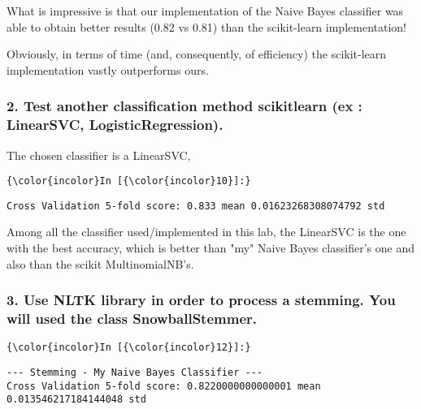 \documentclass[11pt]{article}
\begin{document}
What is impressive is that our implementation of the Naive Bayes
classifier was able to obtain better results (0.82 vs 0.81) than the
scikit-learn implementation!

Obviously, in terms of time (and, consequently, of efficiency) the
scikit-learn implementation vastly outperforms ours.

    \subsubsection{2. Test another classification method scikitlearn (ex :
LinearSVC,
LogisticRegression).}\label{test-another-classification-method-scikitlearn-ex-linearsvc-logisticregression.}

The chosen classifier is a LinearSVC,

    \begin{Verbatim}[commandchars=\\\{\}]
{\color{incolor}In [{\color{incolor}10}]:} 
\end{Verbatim}


    \begin{Verbatim}[commandchars=\\\{\}]
Cross Validation 5-fold score: 0.833 mean 0.01623268308074792 std 

    \end{Verbatim}

    Among all the classifier used/implemented in this lab, the LinearSVC is
the one with the best accuracy, which is better than "my" Naive Bayes
classifier's one and also than the scikit MultinomialNB's.

    \subsubsection{3. Use NLTK library in order to process a stemming. You
will used the class
SnowballStemmer.}\label{use-nltk-library-in-order-to-process-a-stemming.-you-will-used-the-class-snowballstemmer.}

    \begin{Verbatim}[commandchars=\\\{\}]
{\color{incolor}In [{\color{incolor}12}]:} 
\end{Verbatim}


    \begin{Verbatim}[commandchars=\\\{\}]
--- Stemming - My Naive Bayes Classifier ---
Cross Validation 5-fold score: 0.8220000000000001 mean 0.013546217184144048 std 

    \end{Verbatim}
\end{document}
